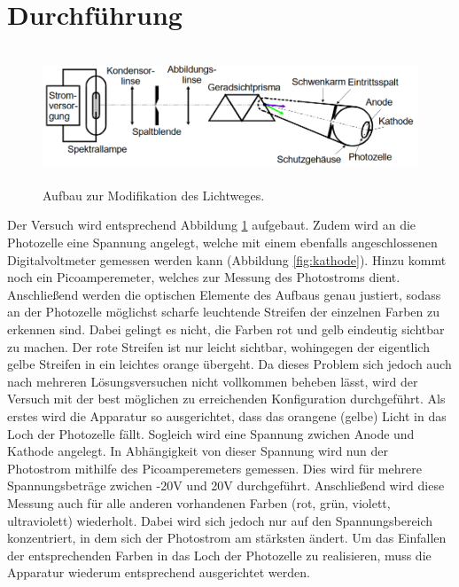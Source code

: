 \section{Durchführung}
\label{sec:Durchführung}

\begin{figure}[H]
  \centering
  \includegraphics[height=4cm]{Versuchsaufbau.PNG}
  \caption{Aufbau zur Modifikation des Lichtweges. \cite{sample}}
  \label{fig:Aufbau}
\end{figure}

Der Versuch wird entsprechend Abbildung \ref{fig:Aufbau} aufgebaut. Zudem wird an
die Photozelle eine Spannung angelegt, welche mit einem ebenfalls angeschlossenen
Digitalvoltmeter gemessen werden kann (Abbildung \ref{fig:kathode}). Hinzu kommt noch
ein Picoamperemeter, welches zur Messung des Photostroms dient.
Anschließend werden die optischen Elemente des Aufbaus genau justiert, sodass
an der Photozelle möglichst scharfe leuchtende Streifen der einzelnen Farben zu erkennen sind.
Dabei gelingt es nicht, die Farben rot und gelb eindeutig sichtbar zu machen.
Der rote Streifen ist nur leicht sichtbar, wohingegen der eigentlich gelbe Streifen
in ein leichtes orange übergeht. Da dieses Problem sich jedoch auch nach mehreren
Lösungsversuchen nicht vollkommen beheben lässt, wird der Versuch mit der best möglichen
zu erreichenden Konfiguration durchgeführt.
Als erstes wird die Apparatur so ausgerichtet, dass das orangene (gelbe) Licht in
das Loch der Photozelle fällt. Sogleich wird eine Spannung zwichen Anode und Kathode angelegt.
In Abhängigkeit von dieser Spannung wird nun der Photostrom mithilfe des Picoamperemeters gemessen.
Dies wird für mehrere Spannungsbeträge zwichen -20V und 20V durchgeführt. Anschließend wird diese
Messung auch für alle anderen vorhandenen Farben (rot, grün, violett, ultraviolett) wiederholt.
Dabei wird sich jedoch nur auf den Spannungsbereich konzentriert, in dem sich der Photostrom am
stärksten ändert. Um das Einfallen der entsprechenden Farben in das Loch der Photozelle zu realisieren,
muss die Apparatur wiederum entsprechend ausgerichtet werden.
